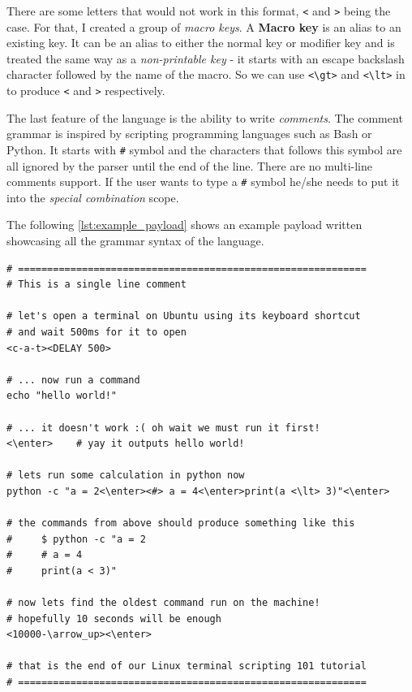 There are some letters that would not work in this format, \verb|<| and \verb|>| being the case. For that, I created a group of \emph{macro keys}. A \textbf{Macro key} is an alias to an existing key. It can be an alias to either the normal key or modifier key and is treated the same way as a \emph{non-printable key} \-- it starts with an escape backslash character followed by the name of the macro. So we can use \verb|<\gt>| and \verb|<\lt>| in to produce \verb|<| and \verb|>| respectively.

The last feature of the language is the ability to write \emph{comments}. The comment grammar is inspired by scripting programming languages such as Bash or Python. It starts with \verb|#| symbol and the characters that follows this symbol are all ignored by the parser until the end of the line. There are no multi-line comments support. If the user wants to type a \verb|#| symbol he/she needs to put it into the \emph{special combination} scope.

The following \autoref{lst:example_payload} shows an example payload written showcasing all the grammar syntax of the language.
\begin{lstlisting}[caption={Example payload in custom language.},
                   label={lst:example_payload}]
# ============================================================
# This is a single line comment

# let's open a terminal on Ubuntu using its keyboard shortcut
# and wait 500ms for it to open
<c-a-t><DELAY 500>

# ... now run a command
echo "hello world!"

# ... it doesn't work :( oh wait we must run it first!
<\enter>    # yay it outputs hello world!

# lets run some calculation in python now
python -c "a = 2<\enter><#> a = 4<\enter>print(a <\lt> 3)"<\enter>

# the commands from above should produce something like this
#     $ python -c "a = 2
#     # a = 4
#     print(a < 3)"

# now lets find the oldest command run on the machine!
# hopefully 10 seconds will be enough
<10000-\arrow_up><\enter>

# that is the end of our Linux terminal scripting 101 tutorial
# ============================================================
\end{lstlisting}

